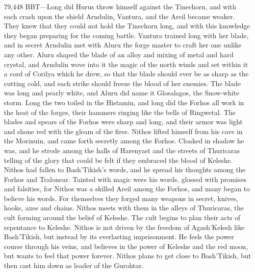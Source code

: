 \documentclass[smalldemyvopaper,11pt,twoside,onecolumn,openright,extrafontsizes]{memoir}
\begin{document}
{{79,448 BBT—Long did Hurus throw himself against the Tinechorn, and with each crash upon the shield Arndulin, Vantura, and the Areil became weaker. They knew that they could not hold the Tinechorn long, and with this knowledge they began preparing for the coming battle. Vantura trained long with her blade, and in secret Arndulin met with Aluru the forge master to craft her one unlike any other. Aluru shaped the blade of an alloy and mixing of metal and hard crystal, and Arndulin wove into it the magic of the north winds and set within it a cord of Corilya which he drew, so that the blade should ever be as sharp as the cutting cold, and each strike should freeze the blood of her enemies. The blade was long and pearly white, and Aluru did name it Glosalagos, the Snow-white storm. Long the two toiled in the Histamin, and long did the Forhos all work in the heat of the forges, their hammers ringing like the bells of Ringwetal. The blades and spears of the Forhos were sharp and long, and their armor was light and shone red with the gleam of the fires.
	Nithos lifted himself from his cave in the Morinuin, and came forth secretly among the Forhos. Cloaked in shadow he was, and he strode among the halls of Harenyast and the streets of Thuricaras telling of the glory that could be felt if they embraced the blood of Keleshe. Nithos had fallen to Bash’Tikish’s words, and he spread his thoughts among the Forhos and Tralonear. Tainted with magic were his words, glossed with promises and falsities, for Nithos was a skilled Areil among the Forhos, and many began to believe his words. For themselves they forged many weapons in secret, knives, hooks, axes and chains. Nithos meets with them in the alleys of Thuricaras, the cult forming around the belief of Keleshe. The cult begins to plan their acts of repentance to Keleshe. Nithos is not driven by the freedom of Agash’Kelesh like Bash’Tikish, but instead by its everlasting imprisonment. He feels the power course through his veins, and believes in the power of Keleshe and the red moon, but wants to feel that power forever. Nithos plans to get close to Bash’Tikish, but then cast him down as leader of the Gurohtar.

}}
\end{document}
